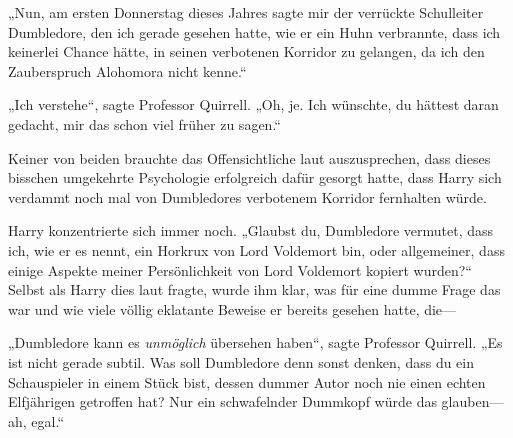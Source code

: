 „Nun, am ersten Donnerstag dieses Jahres sagte mir der verrückte Schulleiter Dumbledore, den ich gerade gesehen hatte, wie er ein Huhn verbrannte, dass ich keinerlei Chance hätte, in seinen verbotenen Korridor zu gelangen, da ich den Zauberspruch Alohomora nicht kenne.“

„Ich verstehe“, sagte Professor Quirrell. „Oh, je. Ich wünschte, du hättest daran gedacht, mir das schon viel früher zu sagen.“

Keiner von beiden brauchte das Offensichtliche laut auszusprechen, dass dieses bisschen umgekehrte Psychologie erfolgreich dafür gesorgt hatte, dass Harry sich verdammt noch mal von Dumbledores verbotenem Korridor fernhalten würde.

Harry konzentrierte sich immer noch.
„Glaubst du, Dumbledore vermutet, dass ich, wie er es nennt, ein Horkrux von Lord Voldemort bin, oder allgemeiner, dass einige Aspekte meiner Persönlichkeit von Lord Voldemort kopiert wurden?“ Selbst als Harry dies laut fragte, wurde ihm klar, was für eine dumme Frage das war und wie viele völlig eklatante Beweise er bereits gesehen hatte, die—

„Dumbledore kann es \emph{unmöglich} übersehen haben“, sagte Professor Quirrell. „Es ist nicht gerade subtil. Was soll Dumbledore denn sonst denken, dass du ein Schauspieler in einem Stück bist, dessen dummer Autor noch nie einen echten Elfjährigen getroffen hat? Nur ein schwafelnder Dummkopf würde das glauben—ah, egal.“

